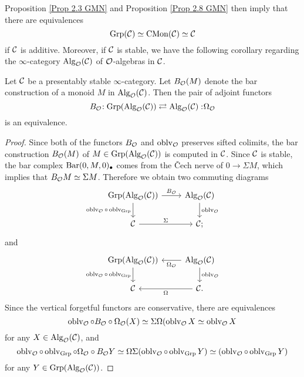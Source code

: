 Proposition \ref{Prop 2.3 GMN} and Proposition \ref{Prop 2.8 GMN} then imply that 
there are equivalences
$$
\operatorname{Grp}({\mathcal{C}})\simeq\operatorname{CMon}({\mathcal{C}}) \simeq {\mathcal{C}}
$$
if ${\mathcal{C}}$ is additive. Moreover, if ${\mathcal{C}}$ is stable, we have the following corollary regarding the $\infty$-category $\operatorname{Alg}_{{\mathcal{O}}}({\mathcal{C}})$ of ${\mathcal{O}}$-algebras in ${\mathcal{C}}$.
\begin{corollary}
    Let ${\mathcal{C}}$ be a presentably stable $\infty$-category.
    Let $B_{{\mathcal{O}}}(M)$ denote the bar construction of a monoid $M$ in $\operatorname{Alg}_{{\mathcal{O}}}({\mathcal{C}})$.
    Then the pair of adjoint functors
$$
B_{{\mathcal{O}}}\negmedspace: \operatorname{Grp}(\operatorname{Alg}_{{\mathcal{O}}}({\mathcal{C}}))\rightleftarrows \operatorname{Alg}_{{\mathcal{O}}}({\mathcal{C}}):\negmedspace \Omega_{{\mathcal{O}}}
$$
is an equivalence.
\end{corollary}
\label{Alg(C) equivalent to groups in Alg(C)}
\begin{proof}
    Since both of the functors $B_{{\mathcal{O}}}$ and $\operatorname{oblv}_{{\mathcal{O}}}$ preserves sifted colimits, the bar construction $B_{{\mathcal{O}}}(M)$ of $M\in \operatorname{Grp}(\operatorname{Alg}_{{\mathcal{O}}}({\mathcal{C}}))$ is computed in ${\mathcal{C}}$.
    Since ${\mathcal{C}}$ is stable, the bar complex $\operatorname{Bar}(0, M, 0)_{\bullet}$ comes from the \v{C}ech nerve of $0 \to \Sigma M$, which implies that
    $B_{{\mathcal{O}}}M \simeq \Sigma M$.
    Therefore we obtain two commuting diagrams
	\[
	\begin{tikzcd}
		\Grp(\Alg_{\CO}(\CC)) & \Alg_{\CO}(\CC) \\
		\CC &
		\CC ;
		\arrow[from=1-1, to=1-2, "B_{\CO}"]
		\arrow[from=1-1, to=2-1, "\oblv_{\CO}\circ \oblv_{\Grp}" left]
		\arrow[from=1-2, to=2-2, "\oblv_{\CO}"]
		\arrow[from=2-1, to=2-2, "\Sigma"]
	\end{tikzcd}
	\]
	and 
	\[
	\begin{tikzcd}
		\Grp(\Alg_{\CO}(\CC)) & \Alg_{\CO}(\CC) \\
		\CC &
		\CC.
		\arrow[from=1-2, to=1-1, "\Omega_{\CO}"]
		\arrow[from=1-1, to=2-1, "\oblv_{\CO}\circ \oblv_{\Grp}" left]
		\arrow[from=1-2, to=2-2, "\oblv_{\CO}"]
		\arrow[from=2-2, to=2-1, "\Omega"]
	\end{tikzcd}
	\]
	Since the vertical forgetful functors are conservative, there are equivalences
$$	    
\operatorname{oblv}_{{\mathcal{O}}}\circ B_{{\mathcal{O}}} \circ  \Omega_{{\mathcal{O}}} (X)
	    \simeq \Sigma \Omega (\operatorname{oblv}_{{\mathcal{O}}}X \simeq \operatorname{oblv}_{{\mathcal{O}}} X
$$
for any $X\in  \operatorname{Alg}_{{\mathcal{O}}}({\mathcal{C}})$,
and 
$$
\operatorname{oblv}_{{\mathcal{O}}}\circ \operatorname{oblv}_{\operatorname{Grp}} \circ \Omega_{{\mathcal{O}}} \circ B_{{\mathcal{O}}} Y
\simeq 
\Omega \Sigma(\operatorname{oblv}_{{\mathcal{O}}}\circ \operatorname{oblv}_{\operatorname{Grp}} Y)
\simeq
(\operatorname{oblv}_{{\mathcal{O}}}\circ \operatorname{oblv}_{\operatorname{Grp}}Y)
$$
for any $Y\in\operatorname{Grp}(\operatorname{Alg}_{{\mathcal{O}}}({\mathcal{C}})) $.
\end{proof}




